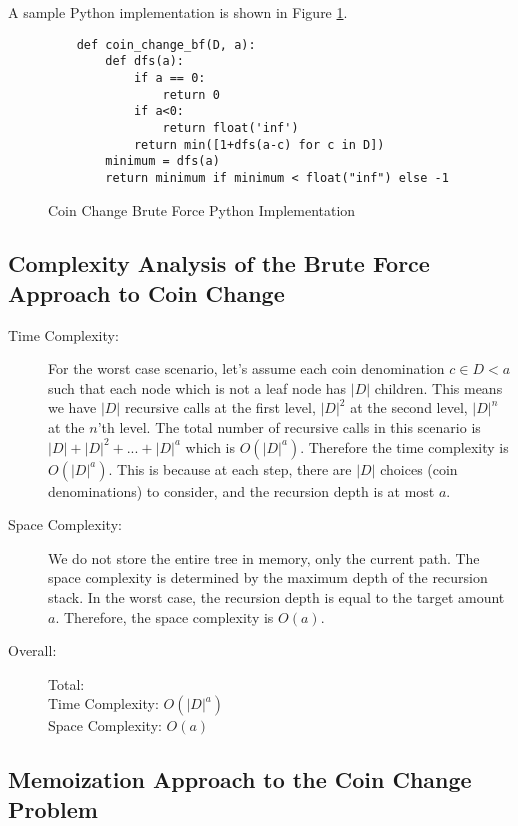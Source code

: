 A sample Python implementation is shown in Figure \ref{fig:coin-change-bf}.

\begin{figure}[h]
    \centering
    \begin{lstlisting}
    def coin_change_bf(D, a):
        def dfs(a):
            if a == 0:
                return 0
            if a<0:
                return float('inf')
            return min([1+dfs(a-c) for c in D])
        minimum = dfs(a)
        return minimum if minimum < float("inf") else -1
    \end{lstlisting}
    \caption{Coin Change Brute Force Python Implementation}
    \label{fig:coin-change-bf}
\end{figure}

\subsection{Complexity Analysis of the Brute Force Approach to Coin Change}

\begin{description}
    \item[Time Complexity:]
    For the worst case scenario, let's assume each coin denomination $c \in D < a$ such that each node which is not a leaf node has $|D|$ children. This means we have $|D|$ recursive calls at the first level, $|D|^{2}$ at the second level, $|D|^{n}$ at the $n$'th level.
    The total number of recursive calls in this scenario is $|D| + |D|^{2} + ... + |D|^{a}$ which is $O(|D|^a)$.
    Therefore the time complexity is $O(|D|^{a})$. This is because at each step, there are $|D|$ choices (coin denominations) to consider, and the recursion depth is at most $a$.
    
        
    \item[Space Complexity:] 
        We do not store the entire tree in memory, only the current path.
        The space complexity is determined by the maximum depth of the recursion stack. In the worst case, the recursion depth is equal to the target amount $a$. Therefore, the space complexity is $O(a)$.
        
        
    \item[Overall:] Total:\\
        Time Complexity: $O(|D|^a)$\\
        Space Complexity: $O(a)$
        
\end{description}

\subsection{Memoization Approach to the Coin Change Problem}

